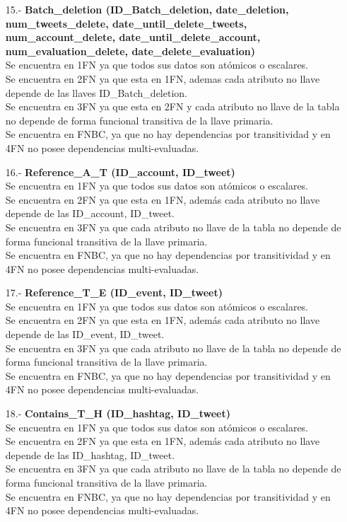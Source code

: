 \documentclass{memoria}
\begin{document}
\begin{itemize}
\item[15.-]\textbf{ Batch\_deletion (ID\_Batch\_deletion, date\_deletion, num\_tweets\_delete, date\_until\_delete\_tweets, num\_account\_delete, date\_until\_delete\_account, num\_evaluation\_delete, date\_delete\_evaluation)}
\\
Se encuentra en 1FN ya que todos sus datos son atómicos o escalares.\\
Se encuentra en 2FN ya que esta en 1FN, ademas cada atributo no llave depende de las llaves ID\_Batch\_deletion.\\ Se encuentra en 3FN ya que esta en 2FN y cada atributo no llave de la tabla no depende de forma funcional transitiva de la llave primaria.\\
Se encuentra en FNBC, ya que no hay dependencias por transitividad y en 4FN no posee dependencias multi-evaluadas.

\item[16.-]\textbf{Reference\_A\_T (ID\_account, ID\_tweet)}
\\
Se encuentra en 1FN ya que todos sus datos son atómicos o escalares.\\
Se encuentra en 2FN ya que esta en 1FN, además cada atributo no llave depende de las ID\_account, ID\_tweet.\\
Se encuentra en 3FN ya que cada atributo no llave de la tabla no depende de forma funcional transitiva de la llave primaria. \\
Se encuentra en FNBC,  ya que no hay dependencias por transitividad y en  4FN no posee dependencias multi-evaluadas.

\item[17.-]\textbf{Reference\_T\_E (ID\_event, ID\_tweet)}
\\
Se encuentra en 1FN ya que todos sus datos son atómicos o escalares.\\
Se encuentra en 2FN ya que esta en 1FN, además cada atributo no llave depende de las ID\_event, ID\_tweet. \\
Se encuentra en 3FN ya que cada atributo no llave de la tabla no depende de forma funcional transitiva de la llave primaria. \\
Se encuentra en FNBC,  ya que no hay dependencias por transitividad y en  4FN no posee dependencias multi-evaluadas.

\item[18.-]\textbf{Contains\_T\_H (ID\_hashtag, ID\_tweet)}
\\
Se encuentra en 1FN ya que todos sus datos son atómicos o escalares.\\
Se encuentra en 2FN ya que esta en 1FN, además cada atributo no llave depende de las ID\_hashtag, ID\_tweet.\\
Se encuentra en 3FN ya que cada atributo no llave de la tabla no depende de forma funcional transitiva de la llave primaria. \\
Se encuentra en FNBC, ya que no hay dependencias por transitividad y en  4FN no posee dependencias multi-evaluadas.


\end{itemize}
\end{document}
